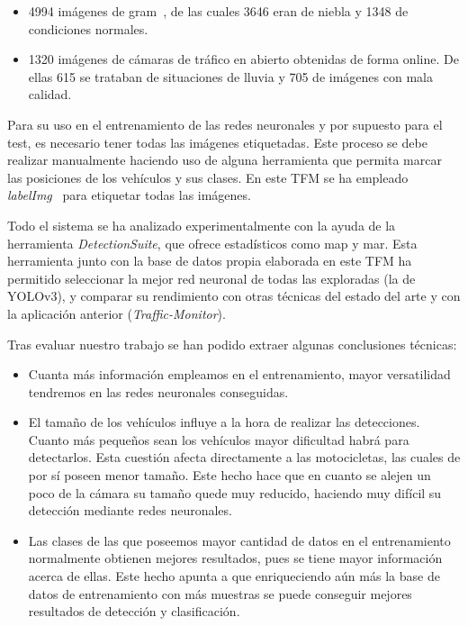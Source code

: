 \begin{itemize}
\begin{itemize}
        \item 4994 imágenes de \acrfull{gram}~\cite{guerrero2013iwinac}, de las cuales 3646 eran de niebla y  1348 de condiciones normales.
        \item 1320 imágenes de cámaras de tráfico en abierto obtenidas de forma online. De ellas 615 se trataban de situaciones de lluvia y 705 de imágenes con mala calidad.
    \end{itemize} 
    Para su uso en el entrenamiento de las redes neuronales y por supuesto para el test, es necesario tener todas las imágenes etiquetadas. Este proceso se debe realizar manualmente haciendo uso de alguna herramienta que permita marcar las posiciones de los vehículos y sus clases. En este TFM se ha empleado \textit{labelImg}~\cite{labelimg} para etiquetar todas las imágenes.
\end{itemize}


Todo el sistema se ha analizado experimentalmente con la ayuda de la herramienta \textit{DetectionSuite}, que ofrece estadísticos como \acrshort{map} y \acrshort{mar}. Esta herramienta junto con la base de datos propia elaborada en este TFM ha permitido seleccionar la mejor red neuronal de todas las exploradas (la de YOLOv3), y comparar su rendimiento con otras técnicas del estado del arte y con la aplicación anterior (\textit{Traffic-Monitor}).

Tras evaluar nuestro trabajo se han podido extraer algunas conclusiones técnicas:
\begin{itemize}
    \item Cuanta más información empleamos en el entrenamiento, mayor versatilidad tendremos en las redes neuronales conseguidas.
    \item El tamaño de los vehículos influye a la hora de realizar las detecciones. Cuanto más pequeños sean los vehículos mayor dificultad habrá para detectarlos. Esta cuestión afecta directamente a las motocicletas, las cuales de por sí poseen menor tamaño. Este hecho hace que en cuanto se alejen un poco de la cámara su tamaño quede muy reducido, haciendo muy difícil su detección mediante redes neuronales.
    \item Las clases de las que poseemos mayor cantidad de datos en el entrenamiento normalmente obtienen mejores resultados, pues se tiene mayor información acerca de ellas. Este hecho apunta a que enriqueciendo aún más la base de datos de entrenamiento con más muestras se puede conseguir mejores resultados de detección y clasificación.
\end{itemize}


